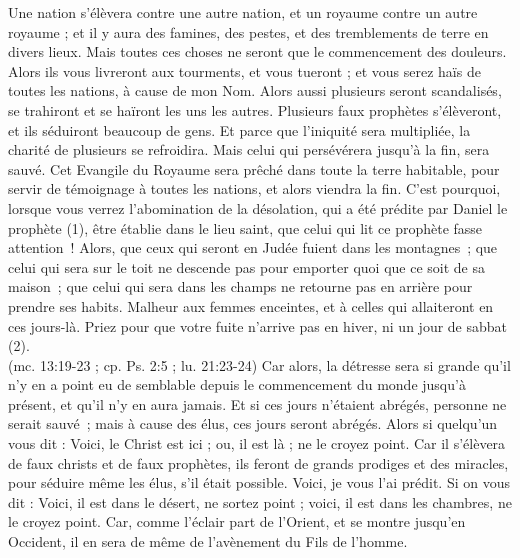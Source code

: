 \begin{multicols}{2}
{Une nation s'élèvera contre une autre nation, et un royaume contre un autre royaume ; et il y aura des famines, des pestes, et des tremblements de terre en divers lieux.
Mais toutes ces choses ne seront que le commencement des douleurs.
Alors ils vous livreront aux tourments, et vous tueront ; et vous serez haïs de toutes les nations, à cause de mon Nom.
Alors aussi plusieurs seront scandalisés, se trahiront et se haïront les uns les autres.
Plusieurs faux prophètes s'élèveront, et ils séduiront beaucoup de gens.
Et parce que l'iniquité sera multipliée, la charité de plusieurs se refroidira.
Mais celui qui persévérera jusqu'à la fin, sera sauvé.
Cet Evangile du Royaume sera prêché dans toute la terre habitable, pour servir de témoignage à toutes les nations, et alors viendra la fin.
C’est pourquoi, lorsque vous verrez l'abomination de la désolation, qui a été prédite par Daniel le prophète (1), être établie dans le lieu saint, que celui qui lit ce prophète fasse attention !
Alors, que ceux qui seront en Judée fuient dans les montagnes ;
que celui qui sera sur le toit ne descende pas pour emporter quoi que ce soit de sa maison ;
que celui qui sera dans les champs ne retourne pas en arrière pour prendre ses habits.
Malheur aux femmes enceintes, et à celles qui allaiteront en ces jours-là.
Priez pour que votre fuite n’arrive pas en hiver, ni un jour de sabbat (2).
\\(mc. 13:19-23 ; cp. Ps. 2:5 ; lu. 21:23-24)
Car alors, la détresse sera si grande qu’il n’y en a point eu de semblable depuis le commencement du monde jusqu’à présent, et qu’il n’y en aura jamais.
Et si ces jours n’étaient abrégés, personne ne serait sauvé ; mais à cause des élus, ces jours seront abrégés.
Alors si quelqu'un vous dit : Voici, le Christ est ici ; ou, il est là ; ne le croyez point.
Car il s'élèvera de faux christs et de faux prophètes, ils feront de grands prodiges et des miracles, pour séduire même les élus, s'il était possible.
Voici, je vous l'ai prédit.
Si on vous dit : Voici, il est dans le désert, ne sortez point ; voici, il est dans les chambres, ne le croyez point.
Car, comme l'éclair part de l'Orient, et se montre jusqu'en Occident, il en sera de même de l'avènement du Fils de l'homme.
}
\end{multicols}
